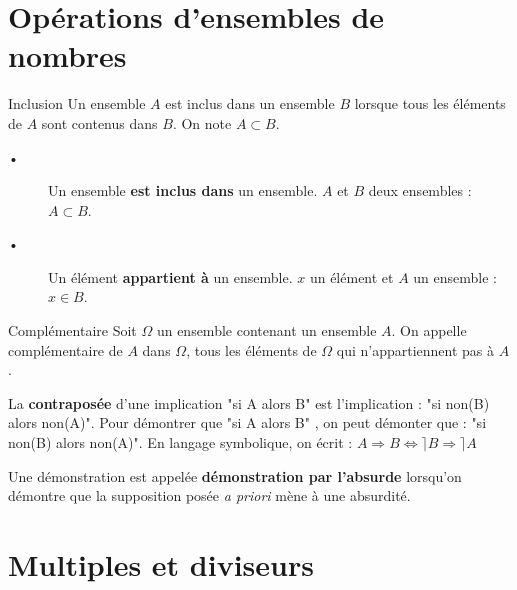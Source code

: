  \begin{pageCours}
 
 
\section{Opérations d'ensembles de nombres}
 
 

\begin{DefT}{Inclusion}
Un ensemble $A$ est inclus dans un ensemble $B$ lorsque tous les éléments de $A$ sont contenus dans $B$. On note $A \subset B$.
\end{DefT}


\begin{Rq}
\begin{description}
\item[•] Un ensemble \textbf{est inclus dans} un ensemble. $A$ et $B$ deux ensembles : $A \subset B$.
\item[•] Un élément \textbf{appartient à} un ensemble. $x$ un élément et $A$ un ensemble : $x \in B$.
\end{description}
\end{Rq}


\begin{DefT}{Complémentaire}
Soit $\Omega$ un ensemble contenant un ensemble $A$. On appelle complémentaire de $A$ dans $\Omega$, tous les éléments de $\Omega$ qui n'appartiennent pas à $A$.
\end{DefT}



\begin{Log}
\begin{description}[leftmargin=*]
\item La \textbf{contraposée} d'une implication "si A alors B" est l'implication : "si non(B) alors non(A)". Pour démontrer que "si A alors B" , on peut démonter que : "si non(B) alors non(A)".  En langage symbolique, on écrit  : $A \Longrightarrow B \Longleftrightarrow \rceil B \Longrightarrow \rceil A$ 
\item Une démonstration est appelée \textbf{démonstration par l'absurde} lorsqu'on démontre que la supposition posée \textit{a priori} mène à une absurdité.
\end{description}
\end{Log}

\section{Multiples et diviseurs}


\end{pageCours}
